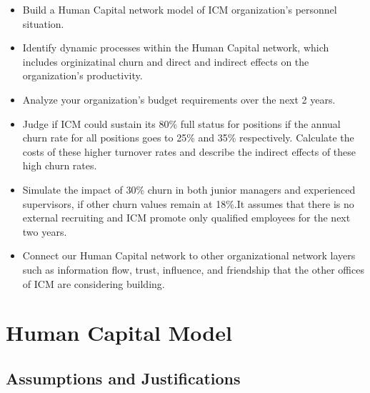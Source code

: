 \documentclass[12pt,a4paper,titlepage]{article}
\begin{document}
\begin{itemize}
\item Build a Human Capital network model of ICM organization’s
  personnel situation.

\item Identify dynamic processes within the Human Capital network,
  which includes orginizatinal churn and direct and indirect effects on
  the organization’s productivity.

\item Analyze your organization’s budget requirements over the next 2
  years.

\item Judge if ICM could sustain its 80\% full status for positions if
  the annual churn rate for all positions goes to 25\% and 35\%
  respectively. Calculate the costs of these higher turnover rates and
  describe the indirect effects of these high churn rates.

\item Simulate the impact of 30\% churn in both junior managers and
  experienced supervisors, if other churn values remain at 18\%.It
  assumes that there is no external recruiting and ICM promote only
  qualified employees for the next two years.

\item Connect our Human Capital network to other organizational
  network layers such as information flow, trust, influence, and
  friendship that the other offices of ICM are considering building.
\end{itemize}

\section{Human Capital Model}
\label{sec:human-capital-model}

\subsection{Assumptions and Justifications}
\label{sec:assumptions-and-justifications}
\end{document}
